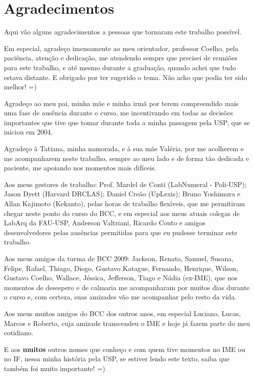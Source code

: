 
\newpage
\section*{Agradecimentos}

Aqui vão alguns agradecimentos a pessoas que tornaram este trabalho possível.

Em especial, agradeço imensamente ao meu orientador, professor Coelho, pela paciência,
atenção e dedicação, me atendendo sempre que precisei de reuniões para este trabalho, e
até mesmo durante a graduação, quando achei que tudo estava distante. E obrigado por
ter sugerido o tema. Não acho que podia ter sido melhor! =)

Agradeço ao meu pai, minha mãe e minha irmã por terem compreendido mais uma fase de
ausência durante o curso, me incentivando em todas as decisões importantes que tive que
tomar durante toda a minha passagem pela USP, que se iniciou em 2004.

Agradeço à Tatiana, minha namorada, e à sua mãe Valéria, por me acolherem e me
acompanharem neste trabalho, sempre ao meu lado e de forma tão dedicada e paciente, me
apoiando nos momentos mais difíceis.

Aos meus gestores de trabalho: Prof. Mardel de Conti (LabNumeral - Poli-USP); Jason
Dyett (Harvard DRCLAS); Daniel Creão (UpLexis); Bruno Yoshimura e Allan Kajimoto
(Kekanto), pelas horas de trabalho flexíveis, que me permitiram chegar neste ponto do
curso do BCC, e em especial aos meus atuais colegas de LabArq da FAU-USP, Anderson
Valtriani, Ricardo Couto e amigos desenvolvedores pelas ausências permitidas para que
eu pudesse terminar este trabalho.

Aos meus amigos da turma de BCC 2009: Jackson, Renato, Samuel, Susana, Felipe, Rafael,
Thiago, Diogo, Gustavo Katague, Fernando, Henrique, Wilson, Gustavo Coelho, Wallace,
Jéssica, Jefferson, Tiago e Nádia (ex-IME), que nos momentos de desespero e de calmaria
me acompanharam por muitos dias durante o curso e, com certeza, suas amizades vão me
acompanhar pelo resto da vida.

Aos meus muitos amigos do BCC dos outros anos, em especial Luciano, Lucas, Marcos e
Roberto, cuja amizade transcendeu o IME e hoje já fazem parte do meu cotidiano.

E aos \textbf{muitos} outros nomes que conheço e com quem tive momentos no IME ou no
IF, nessa minha história pela USP, se estiver lendo este texto, saiba que também foi
muito importante! =)

\afterpage{\clearpage}